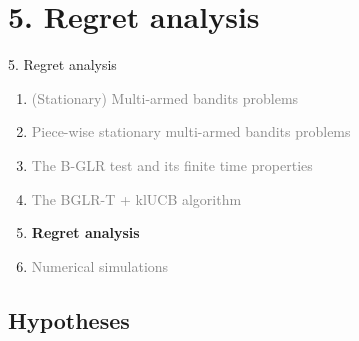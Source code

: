 \documentclass[11pt,english,ignorenonframetext,]{beamer}
\begin{document}
\section{\hfill{}5. Regret analysis\hfill{}}

\begin{frame}{5. Regret analysis}

  \begin{enumerate}
    \item
    \textcolor{gray}{
      (Stationary) Multi-armed bandits problems
    }
    \vspace*{15pt}

    \item
    \textcolor{gray}{
      Piece-wise stationary multi-armed bandits problems
    }
    \vspace*{15pt}

    \item
    \textcolor{gray}{
      The B-GLR test and its finite time properties
    }
    \vspace*{15pt}

    \item
    \textcolor{gray}{
      The BGLR-T + klUCB algorithm
    }
    \vspace*{15pt}

    \item
    \alert{\textbf{%
      Regret analysis
    }}
    \vspace*{15pt}

    \item
    \textcolor{gray}{
      Numerical simulations
    }
  \end{enumerate}

\end{frame}

\subsection{\hfill{}Hypotheses\hfill{}}
\end{document}
